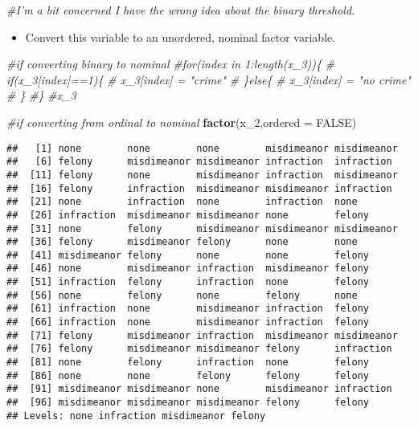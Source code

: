\documentclass[]{article}
\newenvironment{Shaded}{\begin{snugshade}}{\end{snugshade}}
\newcommand{\KeywordTok}[1]{\textcolor[rgb]{0.13,0.29,0.53}{\textbf{#1}}}
\newcommand{\DataTypeTok}[1]{\textcolor[rgb]{0.13,0.29,0.53}{#1}}
\newcommand{\DecValTok}[1]{\textcolor[rgb]{0.00,0.00,0.81}{#1}}
\newcommand{\CommentTok}[1]{\textcolor[rgb]{0.56,0.35,0.01}{\textit{#1}}}
\newcommand{\OtherTok}[1]{\textcolor[rgb]{0.56,0.35,0.01}{#1}}
\newcommand{\NormalTok}[1]{#1}
\providecommand{\tightlist}{%
  \setlength{\itemsep}{0pt}\setlength{\parskip}{0pt}}
\begin{document}
\begin{Shaded}
\begin{Highlighting}[]
\CommentTok{#I'm a bit concerned I have the wrong idea about the binary threshold.}
\end{Highlighting}
\end{Shaded}

\begin{itemize}
\tightlist
\item
  Convert this variable to an unordered, nominal factor variable.
\end{itemize}

\begin{Shaded}
\begin{Highlighting}[]
\CommentTok{#if converting binary to nominal}
\CommentTok{#for(index in 1:length(x_3))\{}
\CommentTok{#  if(x_3[index]==1)\{}
\CommentTok{#    x_3[index] = "crime"}
\CommentTok{#  \}else\{}
\CommentTok{#    x_3[index] = "no crime"}
\CommentTok{#  \}}
\CommentTok{#\}}
\CommentTok{#x_3}

\CommentTok{#if converting from ordinal to nominal}
\KeywordTok{factor}\NormalTok{(x_}\DecValTok{2}\NormalTok{,}\DataTypeTok{ordered =} \OtherTok{FALSE}\NormalTok{)}
\end{Highlighting}
\end{Shaded}

\begin{verbatim}
##   [1] none        none        none        misdimeanor misdimeanor
##   [6] felony      misdimeanor misdimeanor infraction  infraction 
##  [11] felony      none        misdimeanor infraction  misdimeanor
##  [16] felony      infraction  misdimeanor misdimeanor infraction 
##  [21] none        infraction  none        infraction  none       
##  [26] infraction  misdimeanor misdimeanor none        felony     
##  [31] none        felony      misdimeanor misdimeanor misdimeanor
##  [36] felony      misdimeanor felony      none        none       
##  [41] misdimeanor felony      none        none        felony     
##  [46] none        misdimeanor infraction  misdimeanor felony     
##  [51] infraction  felony      infraction  none        felony     
##  [56] none        felony      none        felony      none       
##  [61] infraction  none        misdimeanor infraction  felony     
##  [66] infraction  none        misdimeanor infraction  felony     
##  [71] felony      misdimeanor infraction  misdimeanor misdimeanor
##  [76] felony      misdimeanor misdimeanor felony      infraction 
##  [81] none        felony      infraction  none        felony     
##  [86] none        none        felony      felony      felony     
##  [91] misdimeanor misdimeanor none        misdimeanor infraction 
##  [96] misdimeanor misdimeanor misdimeanor felony      felony     
## Levels: none infraction misdimeanor felony
\end{verbatim}
\end{document}
